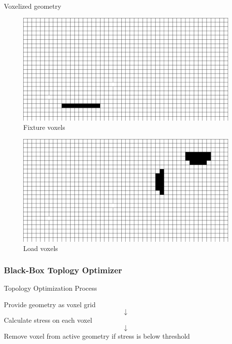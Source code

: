 \begin{frame}{Voxelized geometry}
\hfill
\begin{minipage}{0.49\textwidth}
\begin{figure}
\includegraphics[width=.8\textwidth]{Pictures/Voxels/Fixture.pdf}
\caption{Fixture voxels}
\end{figure}
\vspace{-0.6cm}
\begin{figure}
\includegraphics[width=.8\textwidth]{Pictures/Voxels/Load.pdf}
\caption{Load voxels}
\end{figure}
\end{minipage}
\end{frame}

\subsubsection{Black-Box Toplogy Optimizer}
\begin{frame}{Topology Optimization Process}
\begin{center}
Provide geometry as voxel grid
$$\downarrow$$
Calculate stress on each voxel
$$\downarrow$$
Remove voxel from active geometry if stress is below threshold
\end{center}
\end{frame}

